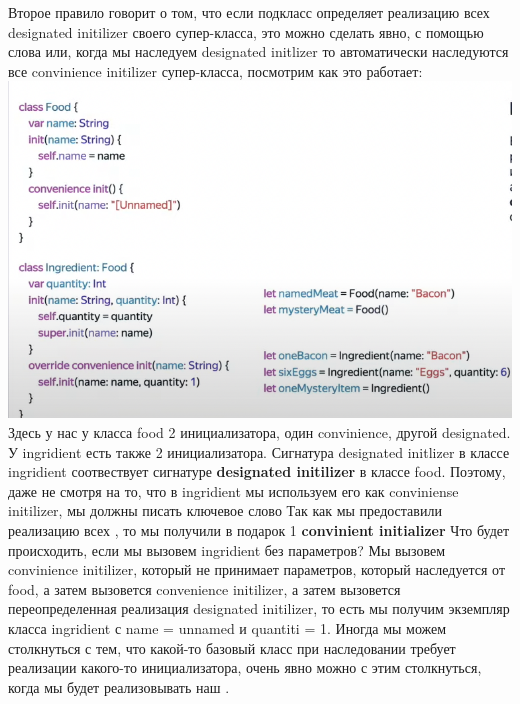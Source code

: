 \documentclass{article}
\begin{document}
    \newline
    Второе правило говорит о том, что если подкласс определяет реализацию всех designated initilizer своего супер-класса, это можно сделать явно, с помощью слова  или, когда мы наследуем designated initlizer то автоматически наследуются все convinience initilizer супер-класса, посмотрим как это работает: 
    \newline
    \includegraphics[scale = 0.5]{pic/FoodSwiftAdv.png}
    \newline
    Здесь у нас у класса food 2 инициализатора, один convinience, другой designated. У ingridient есть также 2 инициализатора. Сигнатура designated initlizer в классе ingridient соотвествует сигнатуре \textbf{designated initilizer} в классе food. Поэтому, даже не смотря на то, что в ingridient мы используем его как conviniense initilizer, мы должны писать ключевое слово 
    \newline
    Так как мы предоставили реализацию всех , то мы получили в подарок 1 \textbf{convinient initializer}
    \newline
    Что будет происходить, если мы вызовем ingridient без параметров? Мы вызовем convinience initilizer, который не принимает параметров, который наследуется от food, а затем вызовется convenience initilizer, а затем вызовется переопределенная реализация designated initilizer, то есть мы получим экземпляр класса ingridient с name = unnamed и quantiti = 1.
    \newline
    Иногда мы можем столкнуться с тем, что какой-то базовый класс при наследовании требует реализации какого-то инициализатора, очень явно можно с этим столкнуться, когда мы будет реализовывать наш . 
\end{document}
